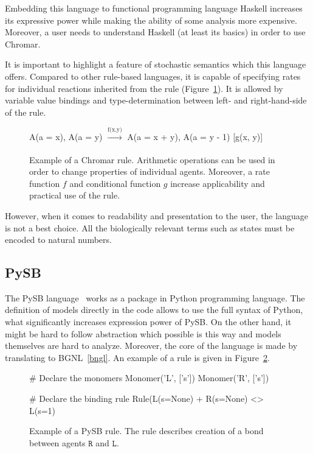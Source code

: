 \documentclass[12pt]{fithesis2}
\begin{document}
Embedding this language to functional programming language Haskell increases its expressive power while making the ability of some analysis more expensive. Moreover, a user needs to understand Haskell (at least its basics) in order to use Chromar.

It is important to highlight a feature of stochastic semantics which this language offers. Compared to other rule-based languages, it is capable of specifying rates for individual reactions inherited from the rule (Figure~\ref{chromar_rule}). It is allowed by variable value bindings and type-determination between left- and right-hand-side of the rule.

\begin{figure}[!h]
\begin{center}
A(a = x), A(a = y) $\xrightarrow[]{\text{f(x,y)}}$ A(a = x + y), A(a = y - 1) [g(x, y)]
\end{center}
\caption{Example of a Chromar rule. Arithmetic operations can be used in order to change properties of individual agents. Moreover, a rate function $f$ and conditional function $g$ increase applicability and practical use of the rule.}\label{chromar-rule}\label{chromar_rule}
\end{figure}

However, when it comes to readability and presentation to the user, the language is not a best choice. All the biologically relevant terms such as states must be encoded to natural numbers.

\subsection{PySB}

The PySB language~\cite{Lopez646} works as a package in Python programming language. The definition of models directly in the code allows to use the full syntax of Python, what significantly increases expression power of PySB. On the other hand, it might be hard to follow abstraction which possible is this way and models themselves are hard to analyze. Moreover, the core of the language is made by translating to BGNL~\ref{bngl}. An example of a rule is given in Figure~\ref{pysb_rule}.

\begin{figure}[!h]
\begin{center}
\begin{python}
# Declare the monomers
Monomer('L', ['s'])
Monomer('R', ['s'])

# Declare the binding rule
Rule(L(s=None) + R(s=None) <> L(s=1) %
\end{python}
\end{center}
\caption{Example of a PySB rule. The rule describes creation of a bond between agents $\mathtt{R}$ and $\mathtt{L}$.}\label{PySB-rule}\label{pysb_rule}
\end{figure}
\end{document}
